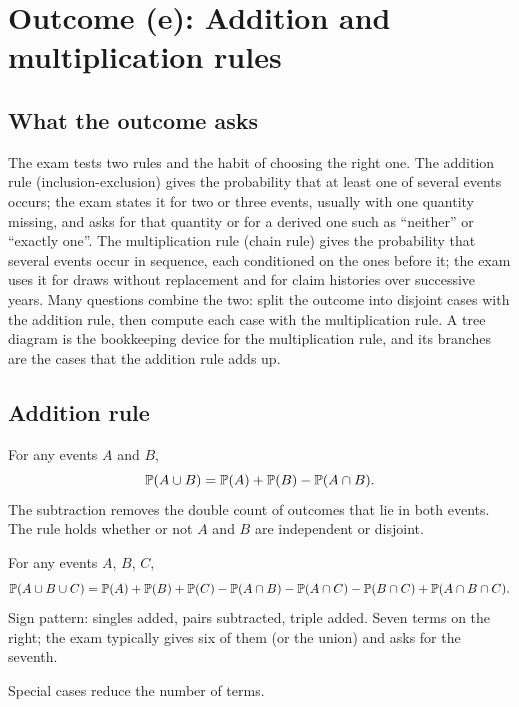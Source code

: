 \section{Outcome (e): Addition and multiplication rules}

\subsection{What the outcome asks}

The exam tests two rules and the habit of choosing the right one. The addition rule
(inclusion-exclusion) gives the probability that at least one of several events occurs; the exam
states it for two or three events, usually with one quantity missing, and asks for that quantity or
for a derived one such as ``neither'' or ``exactly one''. The multiplication rule (chain rule)
gives the probability that several events occur in sequence, each conditioned on the ones before it;
the exam uses it for draws without replacement and for claim histories over successive years.
Many questions combine the two: split the outcome into disjoint cases with the addition rule, then
compute each case with the multiplication rule. A tree diagram is the bookkeeping device for the
multiplication rule, and its branches are the cases that the addition rule adds up.

\subsection{Addition rule}

\begin{keyfact}
For any events $A$ and $B$,
\[
\mathbb{P}(A \cup B) = \mathbb{P}(A) + \mathbb{P}(B) - \mathbb{P}(A \cap B).
\]
The subtraction removes the double count of outcomes that lie in both events. The rule holds
whether or not $A$ and $B$ are independent or disjoint.
\end{keyfact}

\begin{keyfact}
For any events $A$, $B$, $C$,
\[
\mathbb{P}(A \cup B \cup C) = \mathbb{P}(A) + \mathbb{P}(B) + \mathbb{P}(C)
 - \mathbb{P}(A \cap B) - \mathbb{P}(A \cap C) - \mathbb{P}(B \cap C)
 + \mathbb{P}(A \cap B \cap C).
\]
Sign pattern: singles added, pairs subtracted, triple added. Seven terms on the right; the exam
typically gives six of them (or the union) and asks for the seventh.
\end{keyfact}

Special cases reduce the number of terms.

